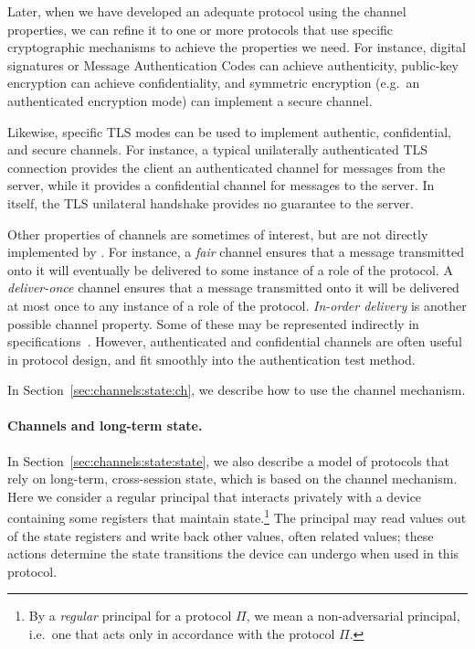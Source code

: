Later, when we have developed an adequate protocol using the channel
properties, we can refine it to one or more protocols that use
specific cryptographic mechanisms to achieve the properties we need.
For instance, digital signatures or Message Authentication Codes can
achieve authenticity, public-key encryption can achieve
confidentiality, and symmetric encryption (e.g.~an authenticated
encryption mode) can implement a secure channel.

Likewise, specific TLS modes can be used to implement authentic,
confidential, and secure channels.  For instance, a typical
unilaterally authenticated TLS connection provides the client an
authenticated channel for messages from the server, while it provides
a confidential channel for messages to the server.  In itself, the TLS
unilateral handshake provides no guarantee to the server.

Other properties of channels are sometimes of interest, but are not
directly implemented by {\cpsa}.  For instance, a \emph{fair} channel
ensures that a message transmitted onto it will eventually be
delivered to some instance of a role of the protocol.  A
\emph{deliver-once} channel ensures that a message transmitted onto it
will be delivered at most once to any instance of a role of the
protocol.  \emph{In-order delivery} is another possible channel
property.  Some of these may be represented indirectly in {\cpsa}
specifications~\cite{Guttman12}.  However, authenticated and
confidential channels are often useful in protocol design, and fit
smoothly into the {\cpsa} authentication test method.

In Section~\ref{sec:channels:state:ch}, we describe how to use the
{\cpsa} channel mechanism.

\paragraph{Channels and long-term state.}  In
Section~\ref{sec:channels:state:state}, we also describe a model of
protocols that rely on long-term, cross-session state, which is based
on the channel mechanism.  Here we consider a regular principal that
interacts privately with a device containing some registers that
maintain state.\footnote{By a \emph{regular} principal for a protocol
  $\Pi$, we mean a non-adversarial principal, i.e.~one that acts only
  in accordance with the protocol $\Pi$.}
%
The principal may read values out of the state registers and write
back other values, often related values; these actions determine the
state transitions the device can undergo when used in this protocol.

